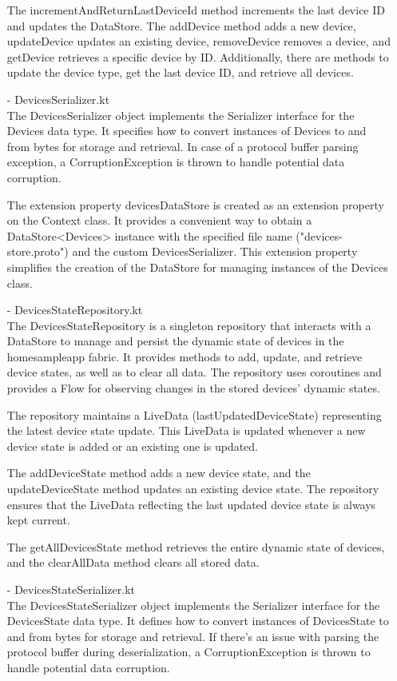 \begin{enumerate}
                              The incrementAndReturnLastDeviceId method increments the last device ID and updates the DataStore. The addDevice method adds a new device, updateDevice updates an existing device, removeDevice removes a device, and getDevice retrieves a specific device by ID. Additionally, there are methods to update the device type, get the last device ID, and retrieve all devices.\\
                        \item[-] DevicesSerializer.kt\\
                              The DevicesSerializer object implements the Serializer interface for the Devices data type. It specifies how to convert instances of Devices to and from bytes for storage and retrieval. In case of a protocol buffer parsing exception, a CorruptionException is thrown to handle potential data corruption.

                              The extension property devicesDataStore is created as an extension property on the Context class. It provides a convenient way to obtain a DataStore<Devices> instance with the specified file name ("devices-store.proto") and the custom DevicesSerializer. This extension property simplifies the creation of the DataStore for managing instances of the Devices class.\\
                        \item[-] DevicesStateRepository.kt\\
                              The DevicesStateRepository is a singleton repository that interacts with a DataStore to manage and persist the dynamic state of devices in the homesampleapp fabric. It provides methods to add, update, and retrieve device states, as well as to clear all data. The repository uses coroutines and provides a Flow for observing changes in the stored devices' dynamic states.

                              The repository maintains a LiveData (lastUpdatedDeviceState) representing the latest device state update. This LiveData is updated whenever a new device state is added or an existing one is updated.

                              The addDeviceState method adds a new device state, and the updateDeviceState method updates an existing device state. The repository ensures that the LiveData reflecting the last updated device state is always kept current.

                              The getAllDevicesState method retrieves the entire dynamic state of devices, and the clearAllData method clears all stored data.\\
                        \item[-] DevicesStateSerializer.kt\\
                              The DevicesStateSerializer object implements the Serializer interface for the DevicesState data type. It defines how to convert instances of DevicesState to and from bytes for storage and retrieval. If there's an issue with parsing the protocol buffer during deserialization, a CorruptionException is thrown to handle potential data corruption.


\end{enumerate}
